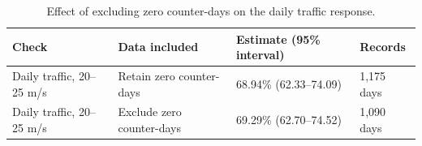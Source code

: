 \begin{table}[H]
\centering
\footnotesize
\caption{Effect of excluding zero counter-days on the daily traffic response.}
\label{tab:traffic-sensitivity}
\begin{tabularx}{\textwidth}{L{0.19\textwidth}L{0.27\textwidth}L{0.22\textwidth}X}
\toprule
Check & Data included & Estimate (95\% interval) & Records \\
\midrule
Daily traffic, 20--25 m/s & Retain zero counter-days & 68.94\% (62.33--74.09) & 1,175 days \\ \grayhline
Daily traffic, 20--25 m/s & Exclude zero counter-days & 69.29\% (62.70--74.52) & 1,090 days \\
\bottomrule
\end{tabularx}
\end{table}

